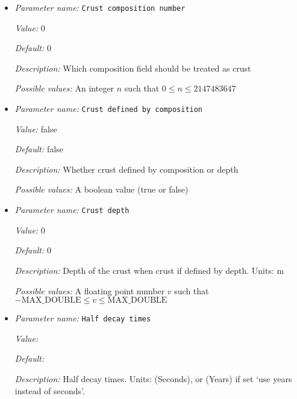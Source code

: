 \begin{itemize}
\item {\it Parameter name:} {\tt Crust composition number}
\label{parameters:Heating model/Radioactive decay/Crust composition number}


{\it Value:} 0


{\it Default:} 0


{\it Description:} Which composition field should be treated as crust


{\it Possible values:} An integer $n$ such that $0\leq n \leq 2147483647$
\item {\it Parameter name:} {\tt Crust defined by composition}
\label{parameters:Heating model/Radioactive decay/Crust defined by composition}


{\it Value:} false


{\it Default:} false


{\it Description:} Whether crust defined by composition or depth


{\it Possible values:} A boolean value (true or false)
\item {\it Parameter name:} {\tt Crust depth}
\label{parameters:Heating model/Radioactive decay/Crust depth}


{\it Value:} 0


{\it Default:} 0


{\it Description:} Depth of the crust when crust if defined by depth. Units: m


{\it Possible values:} A floating point number $v$ such that $-\text{MAX\_DOUBLE} \leq v \leq \text{MAX\_DOUBLE}$
\item {\it Parameter name:} {\tt Half decay times}
\label{parameters:Heating model/Radioactive decay/Half decay times}


{\it Value:} 


{\it Default:} 


{\it Description:} Half decay times. Units: (Seconds), or (Years) if set `use years instead of seconds'.



\end{itemize}
